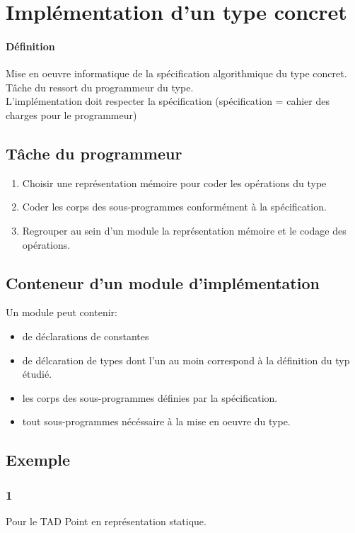 \section{Implémentation d'un type concret}
	\paragraph{Définition}
		Mise en oeuvre informatique de la spécification algorithmique du type concret.\\
		Tâche du ressort du programmeur du type.\\
		L'implémentation doit respecter la spécification (spécification = cahier des charges pour le
			programmeur)

	\subsection{Tâche du programmeur}
		\begin{enumerate}
			\item Choisir une représentation mémoire pour coder les opérations du type
			\item Coder les corps des sous-programmes conformément à la spécification.
			\item Regrouper au sein d'un module la représentation mémoire et le codage des opérations. 
		\end{enumerate}

	\subsection{Conteneur d'un module d'implémentation}
		Un module peut contenir: 
		\begin{itemize}
			\item de déclarations de constantes
			\item de délcaration de types dont l'un au moin correspond à la définition du typ étudié.
			\item les corps des sous-programmes définies par la spécification.
			\item tout sous-programmes nécéssaire à la mise en oeuvre du type. 
		\end{itemize}

	\subsection{Exemple}
		\subsubsection{1}
		Pour le TAD Point en représentation statique.
			

